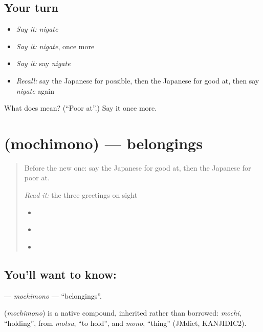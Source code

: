\subsection*{Your turn}
\begin{itemize}
\raggedright
  \item \emph{Say it:} \emph{nigate}
  \item \emph{Say it:} \emph{nigate}, once more
  \item \emph{Say it:} say \emph{nigate}
  \item \emph{Recall:} say the Japanese for possible, then the Japanese for good at, then say \emph{nigate} again
\end{itemize}

\begin{tcolorbox}[breakable,colback=teal!4,colframe=teal!35!black,title={Before you move on}]
What does  mean? (\textquotedblleft{}Poor at\textquotedblright{}.) Say it once more.
\end{tcolorbox}
\section[\texorpdfstring{\ja{もちもの} (mochimono)}{もちもの (mochimono)}]{ (mochimono) — belongings}

\label{lesson:JA-C95-mochimono}



\begin{quote}
Before the new one: say the Japanese for good at, then the Japanese for poor at.

\emph{Read it:} the three greetings on sight

\begin{itemize}
\raggedright
  \item \textbf{}
  \item \textbf{}
  \item \textbf{}
\end{itemize}
\end{quote}

\subsection*{You'll want to know: }
\textbf{} — \emph{mochimono} — \textquotedblleft{}belongings\textquotedblright{}.

\begin{cousinweb}
\textbf{} (\emph{mochimono}) is a native compound, inherited rather than borrowed: \emph{mochi}, \textquotedblleft{}holding\textquotedblright{}, from \emph{motsu}, \textquotedblleft{}to hold\textquotedblright{}, and \emph{mono}, \textquotedblleft{}thing\textquotedblright{} (JMdict, KANJIDIC2).
\end{cousinweb}

